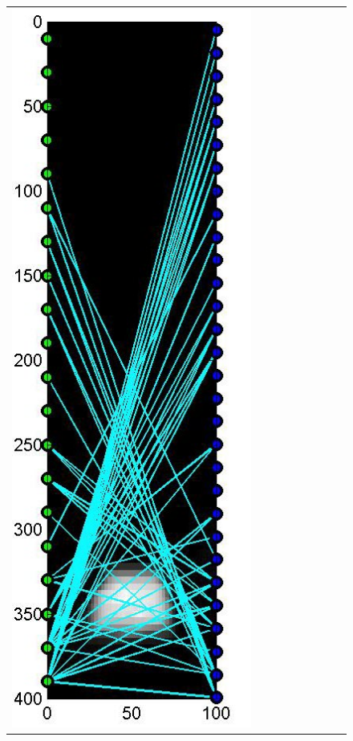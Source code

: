 \documentclass[11pt]{article}
\begin{document}
{\begin{figure}[!h]
\begin{center}
\begin{tabular}{|c|c|c|c|c|c|c|c|c|}
			\includegraphics[width=.9\iwidth]{figures/newFigs/noisy/resultsExp-8-designs}
			&

\end{tabular}
\end{center}
\end{figure}}
\end{document}

